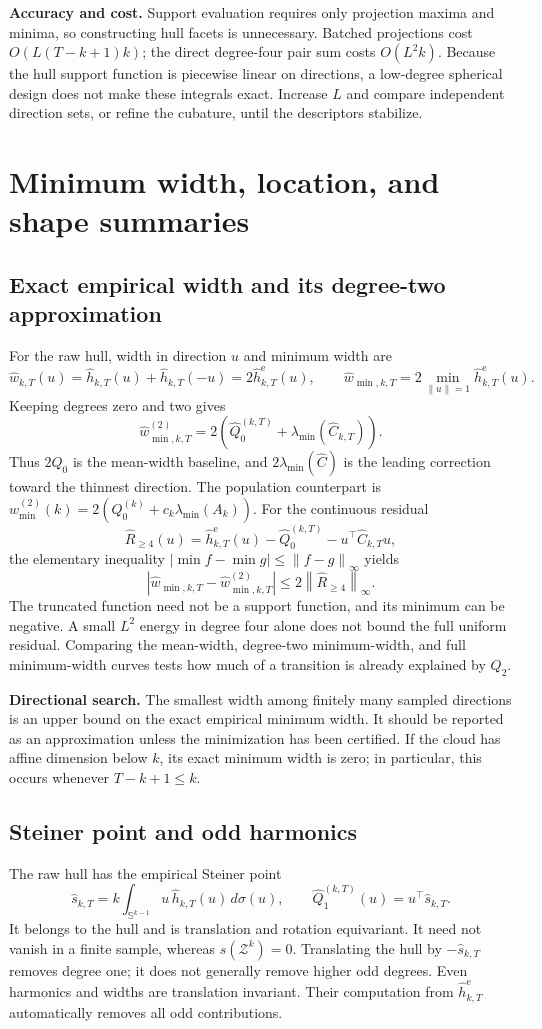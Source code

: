 \documentclass[11pt,a4paper]{article}
\newcommand{\Sph}{\mathbb S}
\newcommand{\norm}[1]{\left\lVert #1\right\rVert}
\newcommand{\he}{\widehat h^{\mathrm e}}
\newcommand{\hh}{\widehat h}
\newcommand{\hQ}{\widehat Q}
\newcommand{\hC}{\widehat C}
\begin{document}
\textbf{Accuracy and cost.} Support evaluation requires only projection maxima and
minima, so constructing hull facets is unnecessary. Batched projections cost
$O(L(T-k+1)k)$; the direct degree-four pair sum costs $O(L^2k)$.
Because the hull support function is piecewise linear on directions, a low-degree
spherical design does not make these integrals exact. Increase $L$ and compare
independent direction sets, or refine the cubature, until the descriptors stabilize.

\newpage
\section{Minimum width, location, and shape summaries}\label{sec:width}
\subsection*{Exact empirical width and its degree-two approximation}
For the raw hull, width in direction $u$ and minimum width are
\[
 \widehat w_{k,T}(u)=\hh_{k,T}(u)+\hh_{k,T}(-u)=2\he_{k,T}(u),\qquad
 \widehat w_{\min,k,T}=2\min_{\norm u=1}\he_{k,T}(u).
\]
Keeping degrees zero and two gives
\[
 \boxed{\quad
 \widehat w_{\min,k,T}^{(2)}
 =2\left(\hQ_0^{(k,T)}+\lambda_{\min}(\hC_{k,T})\right).
 \quad}
\]
Thus $2\hQ_0$ is the mean-width baseline, and $2\lambda_{\min}(\hC)$ is the
leading correction toward the thinnest direction. The population counterpart is
$w_{\min}^{(2)}(k)=2(Q_0^{(k)}+c_k\lambda_{\min}(A_k))$.
For the continuous residual
\[
 \widehat R_{\ge4}(u)=\he_{k,T}(u)-\hQ_0^{(k,T)}-u^\top\hC_{k,T}u,
\]
the elementary inequality $|\min f-\min g|\le\norm{f-g}_\infty$ yields
\[
 \boxed{\quad
 |\widehat w_{\min,k,T}-\widehat w_{\min,k,T}^{(2)}|
 \le2\norm{\widehat R_{\ge4}}_\infty.
 \quad}
\]
The truncated function need not be a support function, and its minimum can be
negative. A small $L^2$ energy in degree four alone does not bound the full
uniform residual. Comparing the mean-width, degree-two minimum-width, and full
minimum-width curves tests how much of a transition is already explained by $Q_2$.

\textbf{Directional search.} The smallest width among finitely many sampled
directions is an upper bound on the exact empirical minimum width. It should be
reported as an approximation unless the minimization has been certified.
If the cloud has affine dimension below $k$, its exact minimum width is zero;
in particular, this occurs whenever $T-k+1\le k$.

\subsection*{Steiner point and odd harmonics}
The raw hull has the empirical Steiner point
\[
 \widehat s_{k,T}=k\int_{\Sph^{k-1}}u\,\hh_{k,T}(u)\,d\sigma(u),\qquad
 \hQ_1^{(k,T)}(u)=u^\top\widehat s_{k,T}.
\]
It belongs to the hull and is translation and rotation equivariant. It need not
vanish in a finite sample, whereas $s(\mathcal Z^k)=0$. Translating the hull by
$-\widehat s_{k,T}$ removes degree one; it does not generally remove higher odd
degrees. Even harmonics and widths are translation invariant. Their computation
from $\he_{k,T}$ automatically removes all odd contributions.
\end{document}
